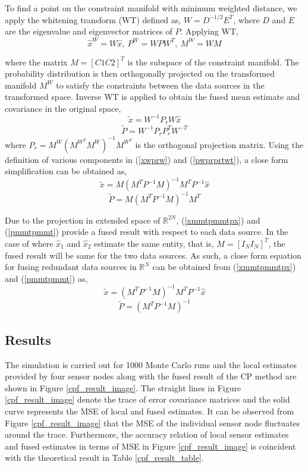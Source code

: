 \documentclass{ieeeaccess}
\begin{document}
To find a point on the constraint manifold with minimum weighted distance, we apply the whitening transform (WT) defined as, $W=D^{-1/2}E^T$, where $D$ and $E$ are the eigenvalue and eigenvector matrices of $P$. Applying WT,
\begin{equation}
\hat{x}^W=W\hat{x},\ P^W=WPW^T,\ M^W=WM
\end{equation}

where the matrix $M = [C1 C2]^T$ is the subspace of the constraint manifold. The probability
distribution is then orthogonally projected on the transformed manifold $M^W$ to satisfy the constraints
between the data sources in the transformed space. Inverse WT is applied to
obtain the fused mean estimate and covariance in the original space,
\begin{equation}
\label{xwprw}
\tilde{x}=W^{-1}P_r W\hat{x}
\end{equation}
\begin{equation}
\label{pwprprtwt}
\tilde{P}=W^{-1}P_r P_{r}^{T}W^{-T}
\end{equation}
where $P_r=M^W(M^{W^T}M^W)^{-1}M^{W^T}$ is the orthogonal projection matrix. Using the definition of various
components in (\ref{xwprw}) and (\ref{pwprprtwt}), a close form simplification can be obtained as,
\begin{equation}
\label{xmmtpmmtpx}
\tilde{x}=M(M^TP^{-1}M)^{-1}M^TP^{-1}\hat{x}
\end{equation}
\begin{equation}
\label{pmmtpmmt}
\tilde{P}=M(M^TP^{-1}M)^{-1}M^T
\end{equation}

Due to the projection in extended space of $\mathbb{R}^{2N}$, (\ref{xmmtpmmtpx}) and (\ref{pmmtpmmt}) provide a fused result with respect to each data source. In the case of where $\hat{x}_1$ and $\hat{x}_2$ estimate the same entity, that is, $M=[I_N I_N]^T$, the fused result will be same for the two data sources. As such, a close form equation for fusing redundant data sources in $\mathbb{R}^N$ can be obtained from (\ref{xmmtpmmtpx}) and (\ref{pmmtpmmt}) as,
\begin{equation}
\tilde{x}=(M^TP^{-1}M)^{-1}M^TP^{-1}\hat{x}
\end{equation}
\begin{equation}
\tilde{P}=(M^TP^{-1}M)^{-1}
\end{equation}
\subsection{Results}
The simulation is carried out for 1000 Monte Carlo runs and the local estimates provided by four
sensor nodes along with the fused result of the CP method are shown in Figure \ref{cpf_result_image}. The straight lines
in Figure \ref{cpf_result_image} denote the trace of error covariance matrices and the solid curve represents the MSE of
local and fused estimates. It can be observed from Figure \ref{cpf_result_image} that the MSE of the individual sensor node fluctuates around the trace. Furthermore, the accuracy relation of
local sensor estimates and fused estimates in terms of MSE in Figure \ref{cpf_result_image} is coincident with the
theoretical result in Table \ref{cpf_result_table}.
\end{document}
